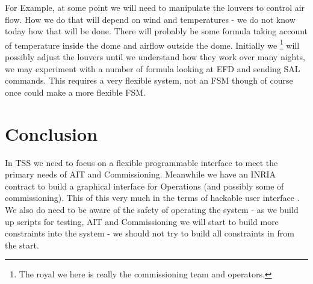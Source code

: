 For Example, at some point we will need to manipulate the louvers to control air flow.
 How we do that will depend on wind and temperatures - we do not know today how that will be done.
There will probably be some formula taking account of temperature inside the dome and airflow outside the dome.
Initially  we \footnote{The royal we here is really the commissioning team and operators.} will possibly adjust the louvers until we understand how they work over many nights, we may experiment with a number of formula looking at EFD and sending SAL commands.
 This requires a very flexible system,  not an FSM though of course once could make a more flexible FSM.

\section{Conclusion}
In TSS we need to focus on a flexible programmable interface to meet the  primary needs of AIT and Commissioning.
Meanwhile we have an INRIA contract to build a graphical interface for Operations (and possibly some of commissioning).
This of this very much in the terms of hackable user interface \citep{2015ASPC..495..101B}.
We also do need to be aware of the safety of operating the system - as we build up scripts for testing, AIT and Commissioning we will start to build more constraints into the system - we should not try to build all constraints in from the start.



